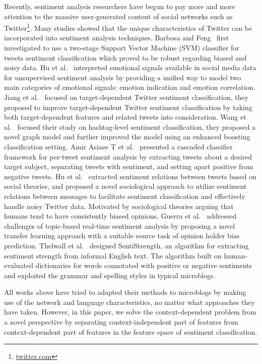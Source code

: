 \documentclass{llncs}
\begin{document}
Recently, sentiment analysis researchers have begun to pay more and more attention to the massive user-generated content of social networks such as Twitter\footnote{\url{twitter.com}}. 
Many studies showed that the unique characteristics of Twitter can be incorporated into sentiment analysis techniques.
Barbosa and Feng~\cite{Barbosa:2010RSD} first investigated to use a two-stage Support Vector Machine (SVM) classifier for tweets sentiment classification which proved to be robust regarding biased and noisy data. 
Hu et al.~\cite{Hu:2013www} interpreted emotional signals available in social media data for unsupervised sentiment analysis by providing a unified way to model two main categories of emotional signals: emotion indication and emotion correlation. 
Jiang et al.~\cite{xsongx:b6} focused on target-dependent Twitter sentiment classification, they proposed to improve target-dependent Twitter sentiment classification by taking both target-dependent features and related tweets into consideration. 
Wang et al.~\cite{Wang:2011TSA} focused their study on hashtag-level sentiment classification, they proposed a novel graph model and further improved the model using an enhanced boosting classification setting. 
Amir Asiaee T et al.~\cite{AsiaeeT:2012} presented a cascaded classifier framework for per-tweet sentiment analysis by extracting tweets about a desired target subject, separating tweets with sentiment, and  setting apart positive from negative tweets.
Hu et al.~\cite{Hu:2013ESR} extracted sentiment relations between tweets based on social theories, and proposed a novel sociological approach to utilize sentiment relations between messages to facilitate sentiment classification and effectively handle noisy Twitter data.
Motivated by sociological theories arguing that humans tend to have consistently biased opinions, Guerra et al.~\cite{CalaisGuerra:2011BOT} addressed challenges of topic-based real-time sentiment analysis by proposing a novel transfer learning approach with a suitable source task of opinion holder bias prediction.
Thelwall et al.~\cite{Thelwall:2010SSS,Thelwall:2012SSD} designed SentiStrength, an algorithm for extracting sentiment strength from informal English text. The algorithm built on human-evaluated dictionaries for words connotated with positive or negative sentiments and exploited the grammar and spelling styles in typical microblogs.

All works above have tried to adapted their methods to microblogs by making use of the network and language characteristics, no matter what approaches they have taken. However, in this paper, we solve the context-dependent problem from a novel perspective by separating context-independent part of features from context-dependent part of features in the feature space of sentiment classification.
\end{document}

